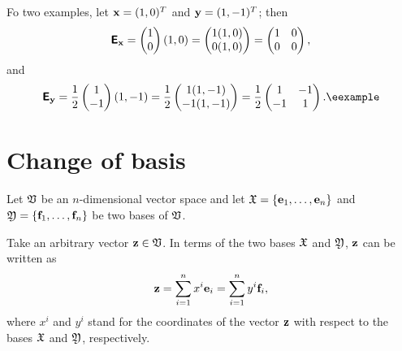 {
\color{blue}
\bexample
Fo two examples, let
${\bf x}=(1,0)^T$
and
${\bf y}=(1,-1)^T$;
then
$$
\textsf{\textbf{E}}_{\bf x}
=
\begin{pmatrix}
1\\
0
\end{pmatrix}
(1,0)
=
\begin{pmatrix}
1(1,0)\\
0(1,0)
\end{pmatrix}
=
\begin{pmatrix}
1&0\\
0&0
\end{pmatrix}
,
$$
and
$$
\textsf{\textbf{E}}_{\bf y}
= \frac{1}{2}
\begin{pmatrix}
1\\
-1
\end{pmatrix}
(1,-1)
= \frac{1}{2}
\begin{pmatrix}
1(1,-1)\\
-1(1,-1)
\end{pmatrix}
= \frac{1}{2}
\begin{pmatrix}
1&-1\\
-1&1
\end{pmatrix}
.
\textrm{\eexample}
$$
}






\section{Change of basis}
\label{2012-m-ch-fdlvs-changeofbasis}

Let ${\frak V}$ be an $n$-dimensional vector space and let
${\frak X}
=
\{
{\bf e}_1,
\ldots ,
{\bf e}_n
\}$
and
${\frak Y}
=  \{
{\bf f}_1,
\ldots ,
{\bf f}_n
\}$ be two bases of ${\frak V}$.

Take an arbitrary vector ${\bf z}\in {\frak V}$.
In terms of the two bases
${\frak X}$ and
${\frak Y}$,
${\bf z}$ can be written as
\begin{equation}
{\bf z}=
\sum_{i=1}^n x^i{\bf e}_i
=
\sum_{i=1}^n  y^i{\bf f}_i,
\label{2011-m-btbexy}
\end{equation}
where $x^i$ and $y^i$ stand for the coordinates of the vector  ${\bf z}$
with respect to the bases ${\frak X}$ and
${\frak Y}$,
respectively.


